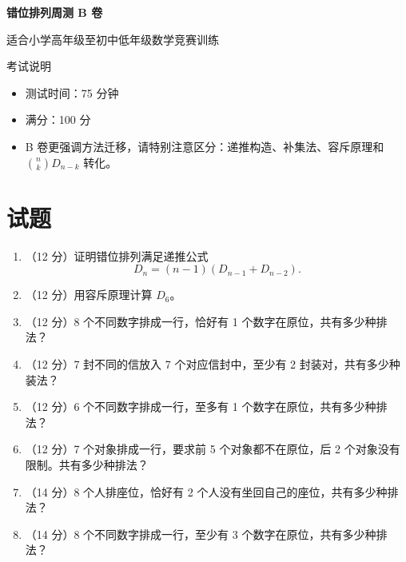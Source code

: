 \documentclass[11pt,a4paper,fontset=fandol]{ctexart}
\newcommand{\answerspace}{\vspace{2.3cm}}
\newcommand{\biganswerspace}{\vspace{3.2cm}}
\begin{document}
\thispagestyle{empty}
\begin{center}
{\fontsize{22}{28}\selectfont\bfseries 错位排列周测 B 卷\par}
\vspace{0.4cm}
{\large 适合小学高年级至初中低年级数学竞赛训练\par}
\end{center}

\begin{infobox}{考试说明}
\begin{itemize}
  \item 测试时间：75 分钟
  \item 满分：100 分
  \item B 卷更强调方法迁移，请特别注意区分：递推构造、补集法、容斥原理和 $\binom{n}{k}D_{n-k}$ 转化。
\end{itemize}
\end{infobox}

\section{试题}

\begin{enumerate}
  \item （12 分）证明错位排列满足递推公式
  \[
  D_n=(n-1)(D_{n-1}+D_{n-2}).
  \]
  \biganswerspace

  \item （12 分）用容斥原理计算 $D_6$。
  \answerspace

  \item （12 分）8 个不同数字排成一行，恰好有 1 个数字在原位，共有多少种排法？
  \answerspace

  \item （12 分）7 封不同的信放入 7 个对应信封中，至少有 2 封装对，共有多少种装法？
  \answerspace

  \item （12 分）6 个不同数字排成一行，至多有 1 个数字在原位，共有多少种排法？
  \answerspace

  \item （12 分）7 个对象排成一行，要求前 5 个对象都不在原位，后 2 个对象没有限制。共有多少种排法？
  \biganswerspace

  \item （14 分）8 个人排座位，恰好有 2 个人没有坐回自己的座位，共有多少种排法？
  \answerspace

  \item （14 分）8 个不同数字排成一行，至少有 3 个数字在原位，共有多少种排法？
  \biganswerspace
\end{enumerate}
\end{document}
